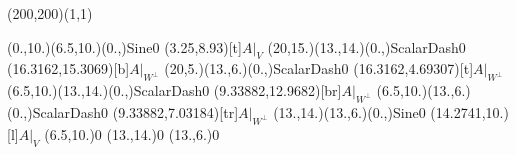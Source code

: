 \unitlength=1bp%

\begin{feynartspicture}(200,200)(1,1)

\FADiagram{}
\FAProp(0.,10.)(6.5,10.)(0.,){Sine}{0}
\FALabel(3.25,8.93)[t]{$A|_V$}
\FAProp(20,15.)(13.,14.)(0.,){ScalarDash}{0}
\FALabel(16.3162,15.3069)[b]{$A|_{W^\perp}$}
\FAProp(20,5.)(13.,6.)(0.,){ScalarDash}{0}
\FALabel(16.3162,4.69307)[t]{$A|_{W^\perp}$}
\FAProp(6.5,10.)(13.,14.)(0.,){ScalarDash}{0}
\FALabel(9.33882,12.9682)[br]{$A|_{W^\perp}$}
\FAProp(6.5,10.)(13.,6.)(0.,){ScalarDash}{0}
\FALabel(9.33882,7.03184)[tr]{$A|_{W^\perp}$}
\FAProp(13.,14.)(13.,6.)(0.,){Sine}{0}
\FALabel(14.2741,10.)[l]{$A|_V$}
\FAVert(6.5,10.){0}
\FAVert(13.,14.){0}
\FAVert(13.,6.){0}
\end{feynartspicture}


